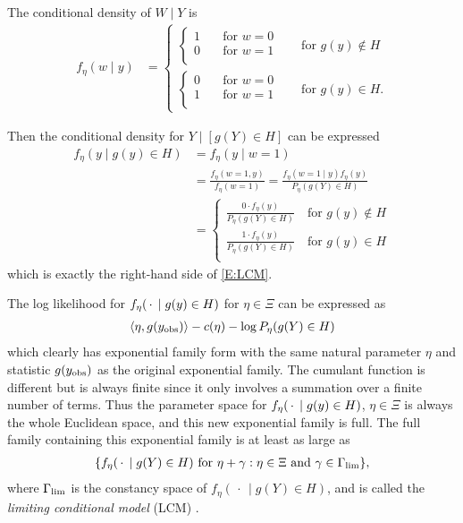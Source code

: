 The conditional density of $W \mid Y$ is
\begin{align*}
	f_\eta(w \mid y) &= \begin{cases}
 			\begin{cases}
			1 	\quad &\text{for $w=0$}\\
			0 	\quad &\text{for $w=1$}\\
			\end{cases} \quad &\text{for } g(y) \notin H\\
 			\begin{cases}
			0 	\quad &\text{for $w=0$}\\
			1 	\quad &\text{for $w=1$}\\
			\end{cases} \quad &\text{for } g(y) \in H.
 		\end{cases}
\end{align*}

Then the conditional density for $Y \mid [g(Y)\in H]$ can be expressed
\begin{align*}
	f_\eta(y \mid g(y) \in H) &= f_\eta(y \mid w=1) \\
					&= \frac{f_\eta(w=1, y)}{f_\eta(w=1)}	
					= \frac{f_\eta(w=1 \mid y) f_\eta(y)}{P_\eta(g(Y) \in H)}  \\%
	&= \begin{cases}
 			\frac{0 \cdot f_\eta(y)}{P_\eta(g(Y) \in H)}   \quad 
					 \text{for $g(y) \notin H$}	\\
 			\frac{1 \cdot f_\eta(y)}{P_\eta(g(Y) \in H)}   \quad 
					 \text{for $g(y) \in H$}	\\
 		\end{cases}
\end{align*}
which is exactly the right-hand side of \eqref{E:LCM}.

The log likelihood for $f_\eta( \,\cdot\, \mid g(y) \in H)$ for $\eta \in \Xi$ can be expressed as
\begin{align*}
	\langle \eta, g(y_{\text{obs}}) \rangle - c(\eta) - \log P_\eta(g(Y) \in H) 
\end{align*}
which clearly has exponential family form with the same natural parameter $\eta$ and 
statistic $g(y_{\text{obs}})$ as the original exponential family.  The cumulant function is 
different but is always finite since it only involves a summation over a finite 
number of terms.  Thus the parameter space for $f_\eta( \,\cdot\, \mid g(y) \in H)$, 
$\eta \in \Xi$ is always the whole Euclidean space, and this new exponential
family is full.  The full family containing this exponential family is 
at least as large as
\begin{align*}
\{ f_{\eta}(\, \cdot\,  \mid g(Y) \in H) \text{ for }  \eta + \gamma: \eta \in \Xi \text
{ and } \gamma \in \Gamma_{\textrm{lim}} \},
\end{align*}
where $\Gamma_{\textrm{lim}}$ is the constancy space of $f_{\eta}( \, \cdot\,  \mid g(Y) \in H)$,
and is called the \emph{limiting conditional model} (LCM) \citep{Geyer:gdor}.  

